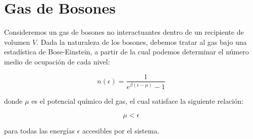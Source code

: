 \documentclass[a4paper,11pt]{article}
\begin{document}
\newpage
\section{Gas de Bosones}

Consideremos un gas de bosones no interactuantes dentro de un 
recipiente de volumen $V$.
Dada la naturaleza de los bosones, debemos tratar al gas bajo una 
estadística de Bose-Einstein, a partir de la cual podemos determinar el 
número medio de ocupación de cada nivel:

$$ n(\epsilon) = \frac{1}{e^{\beta(\epsilon - \mu)} - 1} $$

\noindent donde $\mu$ es el potencial químico del gas, el cual satisface la 
siguiente relación:

$$ \mu < \epsilon $$

\noindent para todas las energías $\epsilon$ accesibles por el sistema.
\end{document}
